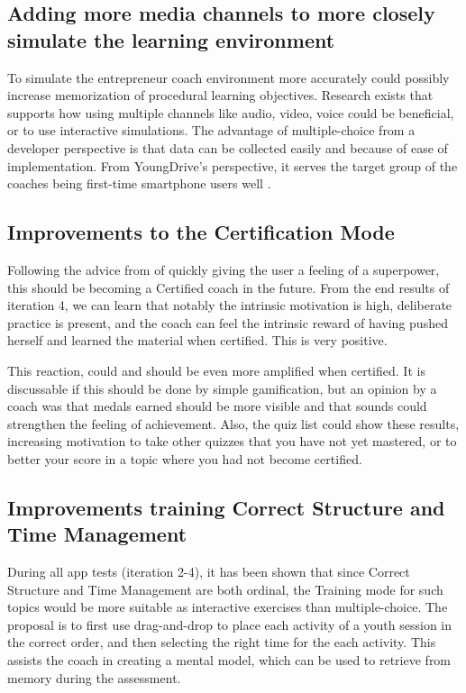 \subsection{Adding more media channels to more closely simulate the learning environment}
To simulate the entrepreneur coach environment more accurately could possibly increase memorization of procedural learning objectives. Research exists that supports how using multiple channels like audio, video, voice could be beneficial, or to use interactive simulations.  The advantage of multiple-choice from a developer perspective is that data can be collected easily and because of ease of implementation. From YoungDrive's perspective, it serves the target group of the coaches being first-time smartphone users well \citep{youngdrive-masterthesis-idea}.

\subsection{Improvements to the Certification Mode}

Following the advice from \cite{sierra} of quickly giving the user a feeling of a superpower, this should be becoming a Certified coach in the future. From the end results of iteration 4, we can learn that notably the intrinsic motivation is high, deliberate practice is present, and the coach can feel the intrinsic reward of having pushed herself and learned the material when certified. This is very positive.

This reaction, could and should be even more amplified when certified. It is discussable if this should be done by simple gamification, but an opinion by a coach was that medals earned should be more visible and that sounds could strengthen the feeling of achievement. Also, the quiz list could show these results, increasing motivation to take other quizzes that you have not yet mastered, or to better your score in a topic where you had not become certified.

\subsection{Improvements training Correct Structure and Time Management}
During all app tests (iteration 2-4), it has been shown that since Correct Structure and Time Management are both ordinal, the Training mode for such topics would be more suitable as interactive exercises than multiple-choice. The proposal is to first use drag-and-drop to place each activity of a youth session in the correct order, and then selecting the right time for the each activity. This assists the coach in creating a mental model, which can be used to retrieve from memory during the assessment.

